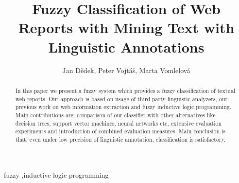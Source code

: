 \documentclass[authoryear,12pt]{elsarticle}
\begin{document}
\begin{frontmatter}


\title{Fuzzy Classification of Web Reports with Mining Text with Linguistic Annotations}
%

\author{Jan D\v{e}dek, Peter Vojt\'a\v{s}, Marta Vomlelov\'a}

\address{Department of Software Engineering, Charles University\\
Institute of Computer Science, Czech Academy of Science\\
Prague, Czech Republic}

\begin{abstract}
In this paper we present a fuzzy system which provides a fuzzy
classification of textual web reports. Our approach is based on usage
of third party linguistic analyzers, our previous work on web
information extraction and fuzzy inductive logic programming. Main
contributions are: comparison of our classifier with other
alternatives like decision trees, support vector machines, neural
networks etc, extensive evaluation experiments and introduction of
combined evaluation measures. Main conclusion is that, even under low
precision of linguistic annotation, classification is satisfactory.
\end{abstract}

\begin{keyword}
fuzzy \sep inductive logic programming


\end{keyword}

\end{frontmatter}
\end{document}
